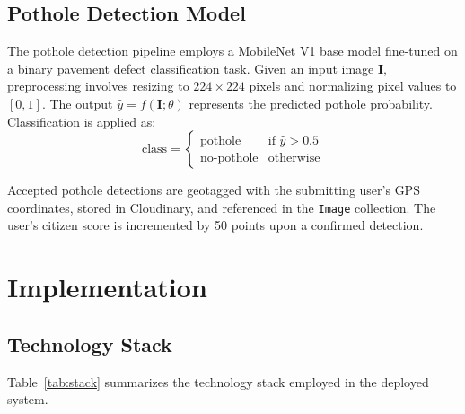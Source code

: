 \documentclass[conference]{IEEEtran}
\begin{document}
\subsection{Pothole Detection Model}

The pothole detection pipeline employs a MobileNet V1 base model fine-tuned on a binary pavement defect classification task. Given an input image $\mathbf{I}$, preprocessing involves resizing to $224 \times 224$ pixels and normalizing pixel values to $[0, 1]$. The output $\hat{y} = f(\mathbf{I}; \theta)$ represents the predicted pothole probability. Classification is applied as:
\begin{equation}
\text{class} =
\begin{cases}
\text{pothole} & \text{if } \hat{y} > 0.5 \\
\text{no-pothole} & \text{otherwise}
\end{cases}
\label{eq:pothole}
\end{equation}

Accepted pothole detections are geotagged with the submitting user's GPS coordinates, stored in Cloudinary, and referenced in the \texttt{Image} collection. The user's citizen score is incremented by 50 points upon a confirmed detection.

\section{Implementation}
\label{sec:implementation}

\subsection{Technology Stack}

Table~\ref{tab:stack} summarizes the technology stack employed in the deployed system.
\end{document}
